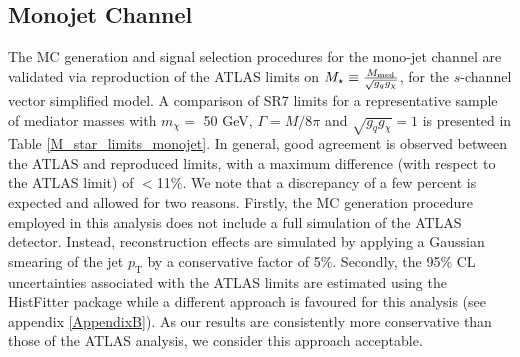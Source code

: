 \subsection{Monojet Channel}
\label{monojet_validation}
The MC generation and signal selection procedures for the mono-jet channel are validated via reproduction of the ATLAS limits on $M_{\star} \equiv \frac{M_{\mathrm{med}}}{\sqrt{g_q g_{\chi}}}$, for the $s$-channel vector simplified model. A comparison of SR7 limits for a representative sample of mediator masses with $m_{\chi} = $ 50 GeV, $\Gamma = M/8\pi$ and $\sqrt{g_{q}g_{\chi}} = 1$ is presented in Table \ref{M_star_limits_monojet}. In general, good agreement is observed between the ATLAS and reproduced limits, with a maximum difference (with respect to the ATLAS limit) of $<$11\%. We note that a discrepancy of a few percent is expected and allowed for two reasons. Firstly, the MC generation procedure employed in this analysis does not include a full simulation of the ATLAS detector. Instead, reconstruction effects are simulated by applying a Gaussian smearing of the jet $p_{\mathrm{T}}$ by a conservative factor of 5\%. Secondly, the 95\% CL uncertainties associated with the ATLAS limits are estimated using the HistFitter package while a different approach is favoured for this analysis (see appendix \ref{AppendixB}). As our results are consistently more conservative than those of the ATLAS analysis, we consider this approach acceptable.


